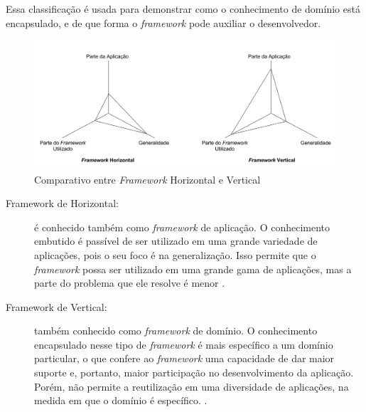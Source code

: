 Essa classificação é usada para demonstrar como o conhecimento de domínio está encapsulado, e de que forma o \textit{framework} pode auxiliar o desenvolvedor.
\begin{figure}[h]
    \centering
    \includegraphics[width=\textwidth]{figuras/frameworkhorizontalvertical.png}
    \caption{Comparativo entre \textit{Framework} Horizontal e Vertical}
    \label{fig:frameworkhorizontalvertical}
  \end{figure}
\par
\begin{description}
\item[Framework de Horizontal:] é conhecido também como \textit{framework} de aplicação. O conhecimento embutido é passível de ser utilizado em uma grande variedade de aplicações, pois o seu foco é na generalização. Isso permite que o \textit{framework} possa ser utilizado em uma grande gama de aplicações, mas a parte do problema que ele resolve é menor \cite{barretoJunior2006}.
\item[Framework de Vertical:] também conhecido como \textit{framework} de domínio. O conhecimento encapsulado nesse tipo de \textit{framework} é mais específico a um domínio particular, o que confere ao \textit{framework} uma capacidade de dar maior suporte e, portanto, maior participação no desenvolvimento da aplicação. Porém, não permite a reutilização em uma diversidade de aplicações, na medida em que o domínio é específico. \cite{barretoJunior2006}.
\end{description}

